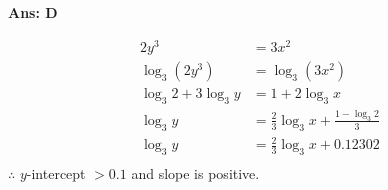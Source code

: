 \documentclass[border=3pt,varwidth=70mm]{standalone}
\begin{document}
\begin{answer}
\hrulefill\par
\textbf{Ans: D}

\begin{equation*}
\begin{aligned}
2y^3 &= 3x^2 \\
\log_{3}(2y^3) &= \log_{3}(3x^2) \\
\log_{3}2 + 3\log_{3}y &= 1 + 2\log_{3}x \\
\log_{3}y &= \frac{2}{3}\log_{3}x + \frac{1-\log_{3}2}{3} \\
\log_{3}y &= \frac{2}{3}\log_{3}x + 0.12302\\
\end{aligned}
\end{equation*}
$\therefore$ $y$-intercept $> 0.1$ and slope is positive.

\end{answer}
\end{document}
